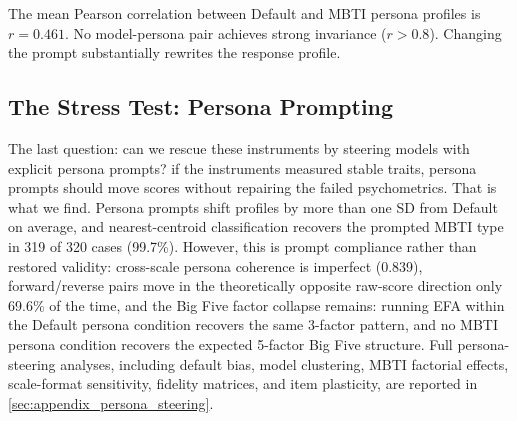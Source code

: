 \documentclass[11pt]{article}
\begin{document}
The mean Pearson correlation between Default and MBTI persona profiles is $r = 0.461$. No model-persona pair achieves strong invariance ($r > 0.8$). Changing the prompt substantially rewrites the response profile.

\subsection{The Stress Test: Persona Prompting}

The last question: can we rescue these instruments by steering models with explicit persona prompts? if the instruments measured stable traits, persona prompts should move scores without repairing the failed psychometrics. That is what we find. Persona prompts shift profiles by more than one SD from Default on average, and nearest-centroid classification recovers the prompted MBTI type in 319 of 320 cases (99.7\%). However, this is prompt compliance rather than restored validity: cross-scale persona coherence is imperfect (0.839), forward/reverse pairs move in the theoretically opposite raw-score direction only 69.6\% of the time, and the Big Five factor collapse remains: running EFA within the Default persona condition recovers the same 3-factor pattern, and no MBTI persona condition recovers the expected 5-factor Big Five structure. Full persona-steering analyses, including default bias, model clustering, MBTI factorial effects, scale-format sensitivity, fidelity matrices, and item plasticity, are reported in \cref{sec:appendix_persona_steering}.



\end{document}

